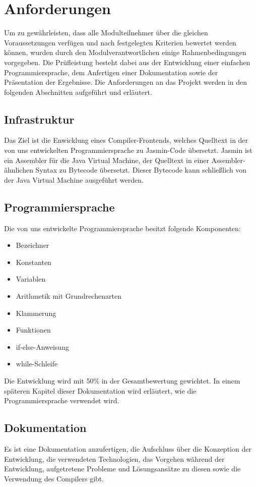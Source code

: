 
\section{Anforderungen}
\label{sec:anforderungen}
Um zu gewährleisten, dass alle Modulteilnehmer über die gleichen Voraussetzungen verfügen und nach festgelegten Kriterien bewertet werden können, wurden durch den Modulverantwortlichen einige Rahmenbedingungen vorgegeben. Die Prüfleistung besteht dabei aus der Entwicklung einer einfachen Programmiersprache, dem Anfertigen einer Dokumentation sowie der Präsentation der Ergebnisse. Die Anforderungen an das Projekt werden in den folgenden Abschnitten aufgeführt und erläutert.

\subsection{Infrastruktur}
Das Ziel ist die Enwicklung eines Compiler-Frontends, welches Quelltext in der von uns entwickelten Programmiersprache zu Jasmin-Code übersetzt. 
Jasmin ist ein Assembler für die Java Virtual Machine, der Quelltext in einer Assembler-ähnlichen Syntax zu Bytecode übersetzt. 
Dieser Bytecode kann schließlich von der Java Virtual Machine ausgeführt werden.


\subsection{Programmiersprache}
Die von uns entwickelte Programmiersprache besitzt folgende Komponenten: 
\begin{itemize}
\item Bezeichner
\item Konstanten
\item Variablen
\item Arithmetik mit Grundrechenarten
\item Klammerung
\item Funktionen
\item if-else-Anweisung
\item while-Schleife
\end{itemize}

Die Entwicklung wird mit 50\% in der Gesamtbewertung gewichtet.
In einem späteren Kapitel dieser Dokumentation wird erläutert, wie die Programmiersprache verwendet wird.

\subsection{Dokumentation}
Es ist eine Dokumentation anzufertigen, die Aufschluss über die Konzeption der Entwicklung, die verwendeten Technologien, das Vorgehen während der Entwicklung, aufgetretene Probleme und Lösungsansätze zu diesen sowie die Verwendung des Compilers gibt.

